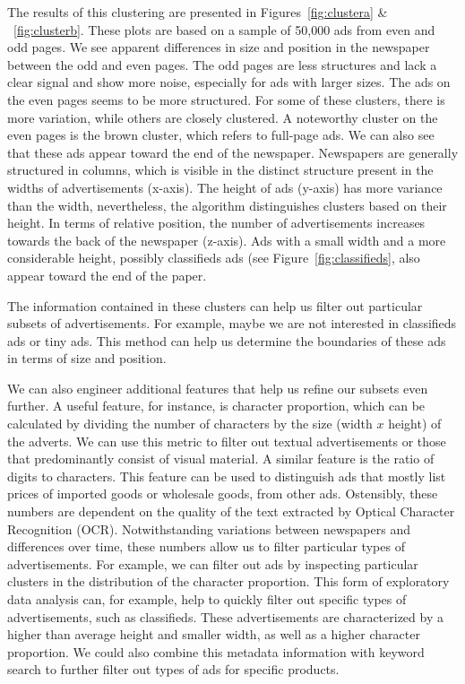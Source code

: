 \documentclass[USenglish]{article}
\begin{document}
The results of this clustering are presented in Figures~\ref{fig:clustera} \& ~\ref{fig:clusterb}. These plots are based on a sample of 50,000 ads from even and odd pages. We see apparent differences in size and position in the newspaper between the odd and even pages. The odd pages are less structures and lack a clear signal and show more noise, especially for ads with larger sizes. The ads on the even pages seems to be more structured. For some of these clusters, there is more variation, while others are closely clustered. A noteworthy cluster on the even pages is the brown cluster, which refers to full-page ads. 
%
We can also see that these ads appear toward the end of the newspaper. Newspapers are generally structured in columns, which is visible in the distinct structure present in the widths of advertisements (x-axis). The height of ads (y-axis) has more variance than the width, nevertheless, the algorithm distinguishes clusters based on their height. In terms of relative position, the number of advertisements increases towards the back of the newspaper (z-axis). Ads with a small width and a more considerable height, possibly classifieds ads (see Figure~\ref{fig:classifieds}, also appear toward the end of the paper. 

The information contained in these clusters can help us filter out particular subsets of advertisements. For example, maybe we are not interested in classifieds ads or tiny ads. This method can help us determine the boundaries of these ads in terms of size and position. 

We can also engineer additional features that help us refine our subsets even further. A useful feature, for instance, is character proportion, which can be calculated by dividing the number of characters by the size (width $x$ height) of the adverts. We can use this metric to filter out textual advertisements or those that predominantly consist of visual material. A similar feature is the ratio of digits to characters. This feature can be used to distinguish ads that mostly list prices of imported goods or wholesale goods, from other ads. 
%
Ostensibly, these numbers are dependent on the quality of the text extracted by Optical Character Recognition (OCR). Notwithstanding variations between newspapers and differences over time, these numbers allow us to filter particular types of advertisements. For example, we can filter out ads by inspecting particular clusters in the distribution of the character proportion. This form of exploratory data analysis can, for example, help to quickly filter out specific types of advertisements, such as classifieds. These advertisements are characterized by a higher than average height and smaller width, as well as a higher character proportion. We could also combine this metadata information with keyword search to further filter out types of ads for specific products. 
\end{document}
